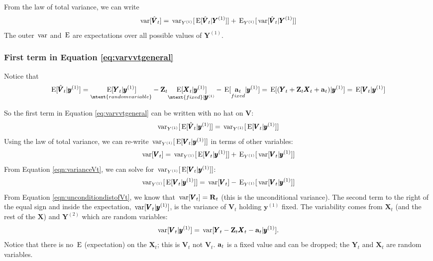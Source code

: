\documentclass[]{article}
\def\XI{\mbox{\boldmath $\Xi$}}
\def\E{\,\textup{\textrm{E}}}
\def\RR{\mbox{$\mathbf R$}}	 \def\rr{\mbox{$\mathbf r$}} \def\Rb{\mbox{$\mathbf H$}}	\def\Rm{\mathbb{R}}
\def\VV{\mbox{$\pmb{V}$}}	\def\vv{\mbox{$\pmb{v}$}}
\def\XX{\mbox{$\pmb{X}$}}	\def\xx{\mbox{$\pmb{x}$}}
\def\YY{\mbox{$\pmb{Y}$}}	\def\yy{\mbox{$\pmb{y}$}}
\def\ZZ{\mbox{$\mathbf Z$}}	\def\zz{\mbox{$\mathbf z$}}	\def\Zb{\mbox{$\mathbf M$}} \def\Za{\mbox{$\mathbf N$}} \def\Zm{\XI}
\def\var{\,\textup{\textrm{var}}}
\begin{document}
From the law of total variance, we can write
\begin{equation}\label{eq:varvvtgeneral}
\var[\hat{\VV}_t] = \var_{Y^{(1)}}[\E[\hat{\VV}_t|\YY^{(1)}]] + \E_{Y^{(1)}}[\var[\hat{\VV}_t|\YY^{(1)}]]
\end{equation}
The outer $\var$ and $\E$ are expectations over  all possible values of $\YY^{(1)}$.

\subsubsection{First term in Equation \ref{eq:varvvtgeneral}}

Notice that 
\begin{equation}
\E[\hat{\VV}_t|\yy^{(1)}]= \underset{\mtext{random variable}}{\E[\YY_t|\yy^{(1)}]} - \ZZ_t \underset{\mtext{fixed} |\yy^{(1)}}{\E[\XX_t|\yy^{(1)}]} - \E[\underset{fixed}{\aa_t}|\yy^{(1)}] \\
=\E[(\YY_t + \ZZ_t \XX_t + \aa_t)|\yy^{(1)}] = \E[\VV_t|\yy^{(1)}] 
\end{equation}

So the first term in Equation \ref{eq:varvvtgeneral} can be written with no hat on $\VV$:
\begin{equation}\label{eq:no.hat.on.V}
\var_{Y^{(1)}}[\E[\hat{\VV}_t|\yy^{(1)}]] = \var_{Y^{(1)}}[\E[\VV_t|\yy^{(1)}]]
\end{equation}
Using the law of total variance, we can re-write $\var_{Y^{(1)}}[\E[\VV_t|\yy^{(1)}]]$ in terms of other variables:
\begin{equation}\label{eqn:varianceVt}
\var[\VV_t] = \var_{Y^{(1)}}[\E[\VV_t|\yy^{(1)}]] + \E_{Y^{(1)}}[\var[\VV_t|\yy^{(1)}]]
\end{equation}
From Equation \ref{eqn:varianceVt}, we can solve for $\var_{Y^{(1)}}[\E[\VV_t|\yy^{(1)}]]$:
\begin{equation}\label{eq:var.E.vtT}
\var_{Y^{(1)}}[\E[\VV_t|\yy^{(1)}]] = \var[\VV_t] - \E_{Y^{(1)}}[\var[\VV_t|\yy^{(1)}]]
\end{equation}
From Equation \ref{eqn:unconditiondistofVt}, we know that $\var[\VV_t]=\RR_t$ (this is the unconditional variance).  The second term to the right of the equal sign and inside the expectation, $\var[\VV_t|\yy^{(1)}]$, is the variance of $\VV_t$ holding $\yy^{(1)}$ fixed. The variability comes from $\XX_t$ (and the rest of the $\XX$) and $\YY^{(2)}$ which are random variables:
\begin{equation}\label{eqn:varvtcondy}
\var[\VV_t|\yy^{(1)}] = \var[ \YY_t - \ZZ_t\XX_t-\aa_t | \yy^{(1)} ].
\end{equation}
Notice that there is no $\E$ (expectation) on the $\XX_t$; this is $\VV_t$ not $\hat{\VV}_t$. $\aa_t$ is a fixed value and can be dropped; the $\YY_t$ and $\XX_t$ are random variables.
\end{document}
